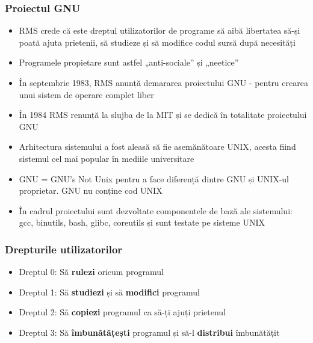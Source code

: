 \documentclass{beamer}
\begin{document}
\begin{frame}[allowframebreaks] %
\frametitle{Proiectul GNU}
\begin{itemize}

\item RMS crede că este dreptul utilizatorilor de programe să aibă libertatea
să-și poată ajuta prietenii, să studieze și să modifice codul sursă 
după necesități
\item Programele propietare sunt astfel „anti-sociale” și „neetice”
\item În septembrie 1983, RMS anunță demararea proiectului GNU - pentru crearea
unui sistem de operare complet liber
\item În 1984 RMS renunță la slujba de la MIT și se dedică în totalitate
proiectului GNU
\item Arhitectura sistemului a fost aleasă să fie asemănătoare UNIX, acesta
fiind sistemul cel mai popular în mediile universitare
\item GNU = GNU's Not Unix pentru a face diferență dintre GNU și UNIX-ul
proprietar. GNU nu conține cod UNIX
\item În cadrul proiectului sunt dezvoltate componentele de bază ale
sistemului: gcc, binutils, bash, glibc, coreutils și sunt testate pe sisteme
UNIX
\end{itemize}
\end{frame}

\begin{frame}[allowframebreaks] %
\frametitle{Drepturile utilizatorilor}
\begin{itemize}

\item Dreptul 0: Să \textbf{rulezi} oricum programul
\item Dreptul 1: Să \textbf{studiezi} și să \textbf{modifici} programul
\item Dreptul 2: Să \textbf{copiezi} programul ca să-ți ajuți prietenul
\item Dreptul 3: Să \textbf{îmbunătățești} programul și să-l
\textbf{distribui} îmbunătățit
\end{itemize}
\end{frame}
\end{document}
